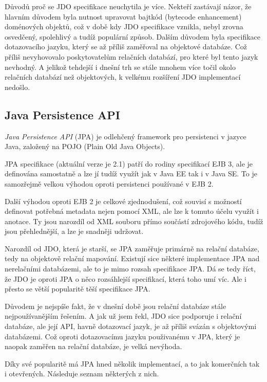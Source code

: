 Důvodů proč se JDO specifikace neuchytila je více. Nekteří zastávají názor, že hlavním důvodem byla nutnost upravovat bajtkód (bytecode enhancement) doménových objektů, což v době kdy JDO specifikace vznikla, nebyl zrovna osvedčený, spolehlivý a tudíž populární způsob. Dalším důvodem byla specifikace dotazovacího jazyku, který se až příliš zaměřoval na objektové databáze. Což příliš nevyhovovalo poskytovatelům relačních databází, pro které byl tento jazyk nevhodný. A jelikož tehdejší i dnešní trh se stále mnohem více točil okolo relačních databází než objektových, k velkému rozšíření JDO implementací nedošlo.

\subsection{Java Persistence API}
\emph{Java Persistence API} (JPA) je odlehčený framework pro persistenci v jazyce Java, založený na POJO (Plain Old Java Objects)\cite{projpa2}.

JPA specifikace (aktuální verze je 2.1\cite{jpa:spec}) patří do rodiny specifikací EJB 3, ale je definována samostatně a lze jí tudíž využít jak v Java EE tak i v Java SE. To je samozřejmě velkou výhodou oproti persistenci používané v EJB 2.

Další výhodou oproti EJB 2 je celkové zjednodušení, což souvisí s možností definovat potřebná metadata nejen pomocí XML, ale lze k tomuto účelu využít i anotace. Ty jsou narozdíl od XML souboru přímo součástí zdrojového kódu, tudíž jsou přehlednější, a lze je snadněji udržovat.

Narozdíl od JDO, která je starší, se JPA zaměřuje primárně na relační databáze, tedy na objektově relační mapování. Existují sice některé implementace JPA nad nerelačními databázemi, ale to je mimo rozsah specifikace JPA. Dá se tedy říct, že JDO je oproti JPA o něco rozsáhlejší specifikací, která toho umí víc. Ale i přesto se větší popularitě těší specifikace JPA.

Důvodem je nejspíše fakt, že v dnešní době jsou relační databáze stále nejpoužívanějším řešením. A jak už jsem řekl, JDO sice podporuje i relační databáze, ale její API, havně dotazovací jazyk, je až příliš svázán s objektovými databázemi. Což oproti dotazovacímu jazyku použivanému v JPA, který je naopak zaměřen na relační databáze, je velká nevýhoda.

Díky své popularitě má JPA hned několik implementací, a to jak komerčních tak i otevřených. Následuje seznam některých z nich.

